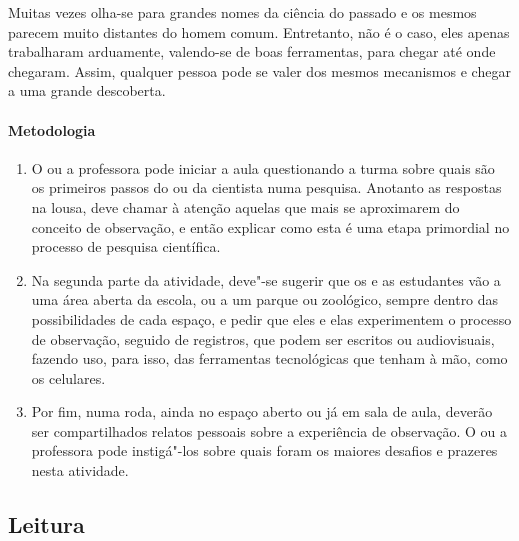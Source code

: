 \documentclass[12pt]{extarticle}
\begin{document}
Muitas vezes olha-se para grandes nomes da ciência do passado e os mesmos
parecem muito distantes do homem comum. Entretanto, não é o caso, eles apenas
trabalharam arduamente, valendo-se de boas ferramentas, para chegar até onde
chegaram. Assim, qualquer pessoa pode se valer dos mesmos mecanismos e chegar
a uma grande descoberta.

\paragraph{Metodologia}

\begin{enumerate}

	\item
	O ou a professora pode iniciar a aula questionando a turma sobre quais
	são os primeiros passos do ou da cientista numa pesquisa. Anotanto as respostas
	na lousa, deve chamar à atenção aquelas que mais se aproximarem do conceito 
	de observação, e então explicar como esta é uma etapa primordial
	no processo de pesquisa científica.

	\item
	Na segunda parte da atividade, deve"-se sugerir que os e as estudantes vão 
	a uma área aberta da escola, ou a um parque ou zoológico, sempre dentro
	das possibilidades de cada espaço, e pedir que eles e elas experimentem
	o processo de observação, seguido de registros, que podem ser
	escritos ou audiovisuais, fazendo uso, para isso, das ferramentas tecnológicas
	que tenham à mão, como os celulares.

	\item
	Por fim, numa roda, ainda no espaço aberto ou já em sala de aula,
	deverão ser compartilhados relatos pessoais sobre a experiência de observação.
	O ou a professora pode instigá"-los sobre quais foram os maiores desafios e 
	prazeres nesta atividade.

\end{enumerate}







\subsection{Leitura}
\end{document}

